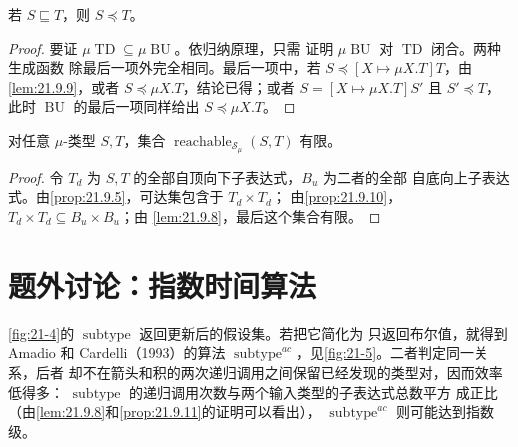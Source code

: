 \begin{proposition}
\label{prop:21.9.10}
若 \(S\sqsubseteq T\)，则 \(S\preccurlyeq T\)。
\end{proposition}

\begin{proof}
要证 \(\mu\operatorname{TD}\subseteq\mu\operatorname{BU}\)。依归纳原理，只需
证明 \(\mu\operatorname{BU}\) 对 \(\operatorname{TD}\) 闭合。两种生成函数
除最后一项外完全相同。最后一项中，若
\(S\preccurlyeq[X\mapsto\mu X.T]T\)，由\cref{lem:21.9.9}，或者
\(S\preccurlyeq\mu X.T\)，结论已得；或者
\(S=[X\mapsto\mu X.T]S'\) 且 \(S'\preccurlyeq T\)，此时
\(\operatorname{BU}\) 的最后一项同样给出 \(S\preccurlyeq\mu X.T\)。
\end{proof}

\begin{proposition}
\label{prop:21.9.11}
对任意 \(\mu\)-类型 \(S,T\)，集合
\(\operatorname{reachable}_{\mathcal S_\mu}(S,T)\) 有限。
\end{proposition}

\begin{proof}
令 \(T_d\) 为 \(S,T\) 的全部自顶向下子表达式，\(B_u\) 为二者的全部
自底向上子表达式。由\cref{prop:21.9.5}，可达集包含于 \(T_d\times T_d\)；
由\cref{prop:21.9.10}，\(T_d\times T_d\subseteq B_u\times B_u\)；由
\cref{lem:21.9.8}，最后这个集合有限。
\end{proof}

\section{题外讨论：指数时间算法}
\label{sec:21.10}

\cref{fig:21-4}的 \(\operatorname{subtype}\) 返回更新后的假设集。若把它简化为
只返回布尔值，就得到 Amadio 和 Cardelli（1993）的算法
\(\operatorname{subtype}^{ac}\)，见\cref{fig:21-5}。二者判定同一关系，后者
却不在箭头和积的两次递归调用之间保留已经发现的类型对，因而效率低得多：
\(\operatorname{subtype}\) 的递归调用次数与两个输入类型的子表达式总数平方
成正比（由\cref{lem:21.9.8}和\cref{prop:21.9.11}的证明可以看出），
\(\operatorname{subtype}^{ac}\) 则可能达到指数级。

